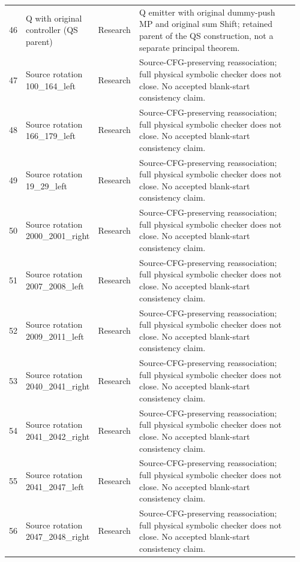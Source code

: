 \begin{longtable}{@{}p{0.035\linewidth}p{0.235\linewidth}p{0.135\linewidth}p{0.55\linewidth}@{}}
46 & Q with original controller (QS parent) & Research & Q emitter with original dummy-push MP and original sum Shift; retained parent of the QS construction, not a separate principal theorem.\\[4pt]
47 & Source rotation 100\_\allowbreak{}164\_\allowbreak{}left & Research & Source-CFG-preserving reassociation; full physical symbolic checker does not close. No accepted blank-start consistency claim.\\[4pt]
48 & Source rotation 166\_\allowbreak{}179\_\allowbreak{}left & Research & Source-CFG-preserving reassociation; full physical symbolic checker does not close. No accepted blank-start consistency claim.\\[4pt]
49 & Source rotation 19\_\allowbreak{}29\_\allowbreak{}left & Research & Source-CFG-preserving reassociation; full physical symbolic checker does not close. No accepted blank-start consistency claim.\\[4pt]
50 & Source rotation 2000\_\allowbreak{}2001\_\allowbreak{}right & Research & Source-CFG-preserving reassociation; full physical symbolic checker does not close. No accepted blank-start consistency claim.\\[4pt]
51 & Source rotation 2007\_\allowbreak{}2008\_\allowbreak{}left & Research & Source-CFG-preserving reassociation; full physical symbolic checker does not close. No accepted blank-start consistency claim.\\[4pt]
52 & Source rotation 2009\_\allowbreak{}2011\_\allowbreak{}left & Research & Source-CFG-preserving reassociation; full physical symbolic checker does not close. No accepted blank-start consistency claim.\\[4pt]
53 & Source rotation 2040\_\allowbreak{}2041\_\allowbreak{}right & Research & Source-CFG-preserving reassociation; full physical symbolic checker does not close. No accepted blank-start consistency claim.\\[4pt]
54 & Source rotation 2041\_\allowbreak{}2042\_\allowbreak{}right & Research & Source-CFG-preserving reassociation; full physical symbolic checker does not close. No accepted blank-start consistency claim.\\[4pt]
55 & Source rotation 2041\_\allowbreak{}2047\_\allowbreak{}left & Research & Source-CFG-preserving reassociation; full physical symbolic checker does not close. No accepted blank-start consistency claim.\\[4pt]
56 & Source rotation 2047\_\allowbreak{}2048\_\allowbreak{}right & Research & Source-CFG-preserving reassociation; full physical symbolic checker does not close. No accepted blank-start consistency claim.\\[4pt]

\end{longtable}
